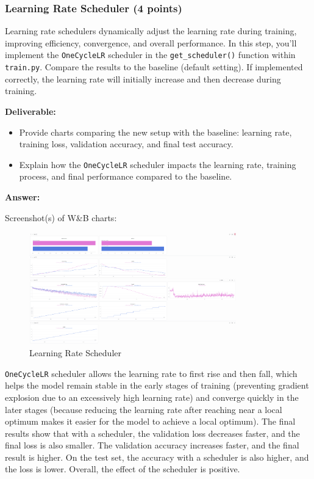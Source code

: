 \documentclass[11pt, oneside]{article}   	%
\begin{document}
\subsubsection*{Learning Rate Scheduler (4 points)}

Learning rate schedulers dynamically adjust the learning rate during training, improving efficiency, convergence, and overall performance. In this step, you'll implement the \texttt{OneCycleLR} scheduler in the \texttt{get\_scheduler()} function within \texttt{train.py}. Compare the results to the baseline (default setting). If implemented correctly, the learning rate will initially increase and then decrease during training.

\noindent\textbf{Deliverable:}
\begin{itemize}
    \item Provide charts comparing the new setup with the baseline: learning rate, training loss, validation accuracy, and final test accuracy.
    \item Explain how the \texttt{OneCycleLR} scheduler impacts the learning rate, training process, and final performance compared to the baseline.
\end{itemize}

\begin{answerbox} \textbf{Answer:} \vspace*{1cm}


Screenshot(s) of W\&B charts:

\begin{figure}[h]
    \centering
    \includegraphics[width=0.8\textwidth]{images/scheduler.png}
    \caption{Learning Rate Scheduler}
\end{figure}

\texttt{OneCycleLR} scheduler allows the learning rate to first rise and then fall, which helps the model remain stable in the early stages of training (preventing gradient explosion due to an excessively high learning rate) and converge quickly in the later stages (because reducing the learning rate after reaching near a local optimum makes it easier for the model to achieve a local optimum). The final results show that with a scheduler, the validation loss decreases faster, and the final loss is also smaller. The validation accuracy increases faster, and the final result is higher. On the test set, the accuracy with a scheduler is also higher, and the loss is lower. Overall, the effect of the scheduler is positive.


\end{answerbox}
\end{document}
